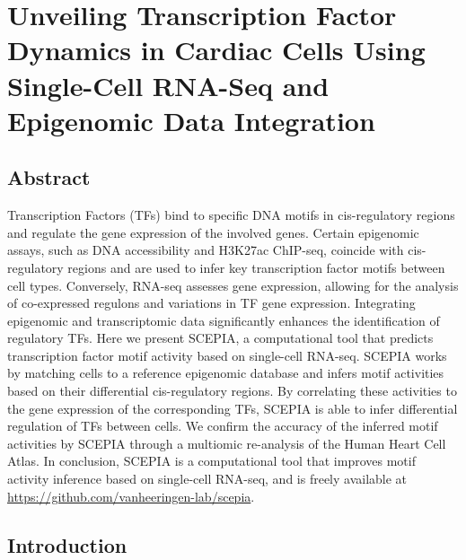 \chapter{Unveiling Transcription Factor Dynamics in Cardiac Cells Using Single-Cell RNA-Seq and Epigenomic Data Integration}\thumbforchapter
{}

\newpage

\section{Abstract}

Transcription Factors (TFs) bind to specific DNA motifs in cis-regulatory regions and regulate the gene expression of the involved genes. Certain epigenomic assays, such as DNA accessibility and H3K27ac ChIP-seq, coincide with cis-regulatory regions and are used to infer key transcription factor motifs between cell types. Conversely, RNA-seq assesses gene expression, allowing for the analysis of co-expressed regulons and variations in TF gene expression. Integrating epigenomic and transcriptomic data significantly enhances the identification of regulatory TFs. Here we present SCEPIA, a computational tool that predicts transcription factor motif activity based on single-cell RNA-seq. SCEPIA works by matching cells to a reference epigenomic database and infers motif activities based on their differential cis-regulatory regions. By correlating these activities to the gene expression of the corresponding TFs, SCEPIA is able to infer differential regulation of TFs between cells. We confirm the accuracy of the inferred motif activities by SCEPIA through a multiomic re-analysis of the Human Heart Cell Atlas. In conclusion, SCEPIA is a computational tool that improves motif activity inference based on single-cell RNA-seq, and is freely available at \url{https://github.com/vanheeringen-lab/scepia}.

\section{Introduction}

